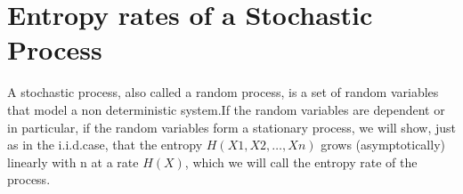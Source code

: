 \documentclass[10pt,twocolumn,letterpaper]{article}
\begin{document}



\maketitle



\section{Entropy rates of a Stochastic Process}


A stochastic process, also called a random process, is a set of random variables that model a non deterministic system.If the random variables are dependent or in particular, if the random variables form a stationary process, we will show, just as in the i.i.d.case, that the entropy
\begin{math}H (X 1 , X 2 , \dots , X n )\end{math} grows (asymptotically) linearly with n at a rate \begin{math}H ( X )\end{math}, which we will call the entropy rate of the process.
\end{document}
